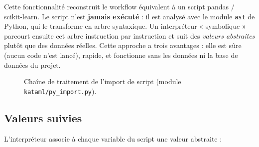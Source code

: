 \documentclass[11pt,a4paper]{article}
\newcommand{\code}[1]{\texttt{#1}}
\begin{document}
Cette fonctionnalité reconstruit le workflow équivalent à un script pandas /
scikit-learn. Le script n'est \textbf{jamais exécuté} : il est analysé avec le module
\code{ast} de Python, qui le transforme en arbre syntaxique. Un interpréteur
« symbolique » parcourt ensuite cet arbre instruction par instruction et suit des
\emph{valeurs abstraites} plutôt que des données réelles. Cette approche a trois
avantages : elle est sûre (aucun code n'est lancé), rapide, et fonctionne sans les
données ni la base de données du projet.

\begin{figure}[ht]
\centering
{}
\caption{Chaîne de traitement de l'import de script (module \code{kataml/py\_import.py}).}
\end{figure}

\subsection{Valeurs suivies}

L'interpréteur associe à chaque variable du script une valeur abstraite :
\end{document}
